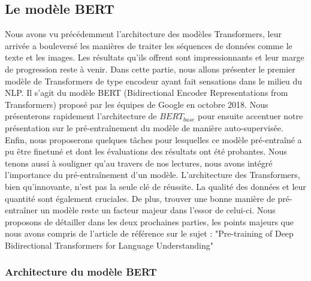 \documentclass[12pt]{article}
\theoremstyle{definition}
\begin{document}
 
\subsection{Le modèle BERT}

Nous avons vu précédemment l’architecture des modèles Transformers, leur arrivée a bouleversé les manières de traiter les séquences de données comme le texte et les images. Les résultats qu'ils offrent sont impressionnants et leur marge de progression reste à venir. Dans cette partie, nous allons présenter le premier modèle de Transformers de type encodeur ayant fait sensations dans le milieu du NLP. Il s’agit du modèle BERT (Bidirectional Encoder Representations from Transformers) proposé par les équipes de Google en octobre 2018. Nous présenterons rapidement l’architecture de $BERT_{base}$ pour ensuite accentuer notre présentation sur le pré-entraînement du modèle de manière auto-supervisée. Enfin, nous proposerons quelques tâches pour lesquelles ce modèle pré-entraîné a pu être finetuné et dont les évaluations des résultats ont été probantes. Nous tenons aussi à souligner qu’au travers de nos lectures, nous avons intégré l’importance du pré-entraînement d’un modèle. L’architecture des Transformers, bien qu’innovante, n’est pas la seule clé de réussite. La qualité des données et leur quantité sont également cruciales. De plus, trouver une bonne manière de pré-entraîner un modèle reste un facteur majeur dans l’essor de celui-ci. Nous proposons de détailler dans les deux prochaines parties, les points majeurs que nous avons compris de l'article de référence sur le sujet : "Pre-training of Deep Bidirectional Transformers for
Language Understanding" \cite{bert_paper}

\subsubsection{Architecture du modèle BERT}
\end{document}
